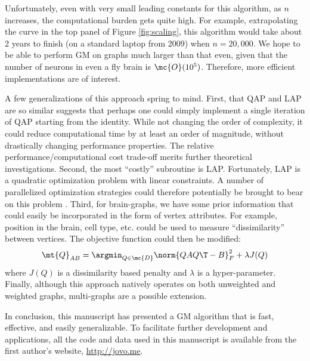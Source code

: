 \documentclass[10pt,journal,cspaper,compsoc]{IEEEtran}
\begin{document}
Unfortunately, even with very small leading constants for this algorithm, as $n$ increases, the computational burden gets quite high.  For example, extrapolating the curve in the top panel of Figure \ref{fig:scaling}, this algorithm would take about 2 years to finish (on a standard laptop from 2009) when $n=20,000$.  We hope to be able to perform GM on graphs much larger than that even, given that the number of neurons in even a fly brain is $\mc{O}(10^5)$.  Therefore, more efficient implementations are of interest.  

A few generalizations of this approach spring to mind.  First, that QAP and LAP are so similar suggests that perhaps one could simply implement a single iteration of QAP starting from the identity.  While not changing the order of complexity, it could reduce computational time by at least an order of magnitude, without drastically changing performance properties.  The relative performance/computational cost trade-off merits further theoretical investigations.  Second, the most ``costly'' subroutine is LAP.  Fortunately, LAP is a quadratic optimization problem with linear constraints.  A number of parallelized optimization strategies could therefore potentially be brought to bear on this problem \cite{Boyd2011}.  Third, for brain-graphs, we have some prior information that could easily be incorporated in the form of vertex attributes.  For example, position in the brain, cell type, etc. could be used to measure ``dissimilarity'' between vertices.  The objective function could then be modified:
\begin{align} \label{eq:Jqap}
	\mt{Q}_{AB}= \argmin_{Q \in \mc{D}} \norm{Q A Q\T - B}^2_F + \lambda J(Q)
\end{align}
where $J(Q)$ is a dissimilarity based penalty and $\lambda$ is a hyper-parameter.  Finally, although this approach natively operates on both unweighted and weighted graphs, multi-graphs are a possible extension.

In conclusion, this manuscript has presented a GM algorithm that is fast, effective, and easily generalizable.  To facilitate further development and applications, all the code and data used in this manuscript is available from the first author's website, \url{http://jovo.me}.












\ifCLASSOPTIONcompsoc
\end{document}
